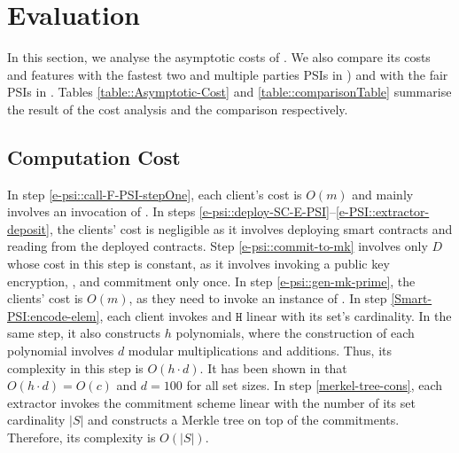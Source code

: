 


\vs
\vs

\section{Evaluation}\label{sec::valuation}
In this section, we analyse the asymptotic costs of \epsi. We also compare its costs and features with the fastest two and multiple parties PSIs in \cite{AbadiDMT22,DBLP:conf/ccs/KolesnikovMPRT17,NevoTY21,RaghuramanR22}) and with the fair PSIs in \cite{DebnathD16,DBLP:conf/dbsec/DongCCR13}. Tables \ref{table::Asymptotic-Cost} and \ref{table::comparisonTable} summarise the result of the cost analysis and the comparison respectively. 


\vs




\vs
\vs
\vs



\vs
\vs



\subsection{Computation Cost}


In step \ref{e-psi::call-F-PSI-stepOne}, each client's cost is $O(m)$ and mainly involves an invocation of \ct. 
% 
In steps \ref{e-psi::deploy-SC-E-PSI}--\ref{e-PSI::extractor-deposit}, the clients' cost is negligible as it involves deploying smart contracts and reading from the deployed contracts. 
%
Step \ref{e-psi::commit-to-mk} involves only $D$ whose cost in this step is constant, as it involves invoking a public key encryption, \prf,  and commitment only once. In step \ref{e-psi::gen-mk-prime}, the clients' cost is  $O(m)$, as they need to invoke an instance of \ct. 
%
In step \ref{Smart-PSI:encode-elem}, each client invokes \prp and $\mathtt{H}$ linear with its set's cardinality. In the same step, it also constructs $h$ polynomials, where the construction of each polynomial involves $d$  modular multiplications and additions. Thus, its complexity in this step is $O(h\cdot d)$. It has been shown in \cite{AbadiDMT22} that $O(h\cdot d)=O(c)$ and  $d=100$ for all set sizes. 
%
In step \ref{merkel-tree-cons}, each extractor invokes the commitment scheme linear with the number of its set cardinality $|S|$ and constructs a Merkle tree on top of the commitments. Therefore, its complexity is $O(|S|)$. 


